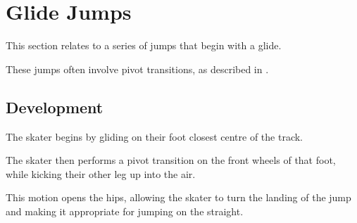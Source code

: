 \section{Glide Jumps}
\label{sec:jumps/glide_jumps}

This section relates to a series of jumps that begin with a glide.

These jumps often involve pivot transitions, as described in .

\subsection{Development}
The skater begins by gliding on their foot closest centre of the track. 

The skater then performs a pivot transition on the front wheels of that foot, while kicking their other leg up into the air.  

This motion opens the hips, allowing the skater to turn the landing of the jump and making it appropriate for jumping on the straight. 
